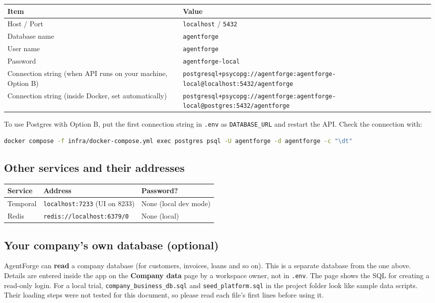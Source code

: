 \documentclass[11pt,a4paper]{article}
\newcommand{\env}[1]{\texttt{#1}}
\begin{document}
\begin{longtable}{@{}L{4.4cm}L{11cm}@{}}
\toprule
\textbf{Item} & \textbf{Value} \\
\midrule
\endhead
Host / Port & \texttt{localhost} / \texttt{5432} \\
Database name & \texttt{agentforge} \\
User name & \texttt{agentforge} \\
Password & \texttt{agentforge-local} \\
Connection string (when API runs on your machine, Option B) & \texttt{postgresql+psycopg://agentforge:agentforge-local@localhost:5432/agentforge} \\
Connection string (inside Docker, set automatically) & \texttt{postgresql+psycopg://agentforge:agentforge-local@postgres:5432/agentforge} \\
\bottomrule
\end{longtable}

To use Postgres with Option B, put the first connection string in \texttt{.env} as
\env{DATABASE\_URL} and restart the API. Check the connection with:

\begin{lstlisting}[language=bash]
docker compose -f infra/docker-compose.yml exec postgres psql -U agentforge -d agentforge -c "\dt"
\end{lstlisting}

\subsection{Other services and their addresses}

\begin{longtable}{@{}L{3.2cm}L{6cm}L{6.2cm}@{}}
\toprule
\textbf{Service} & \textbf{Address} & \textbf{Password?} \\
\midrule
\endhead
Temporal & \texttt{localhost:7233} (UI on 8233) & None (local dev mode) \\
Redis & \texttt{redis://localhost:6379/0} & None (local) \\
\bottomrule
\end{longtable}

\subsection{Your company's own database (optional)}

AgentForge can \textbf{read} a company database (for customers, invoices, loans and
so on). This is a separate database from the one above. Details are entered inside
the app on the \textbf{Company data} page by a workspace owner, not in \texttt{.env}.
The page shows the SQL for creating a read-only login. For a local trial,
\texttt{company\_business\_db.sql} and \texttt{seed\_platform.sql} in the project folder
look like sample data scripts. Their loading steps were not tested for this document,
so please read each file's first lines before using it.
\end{document}
